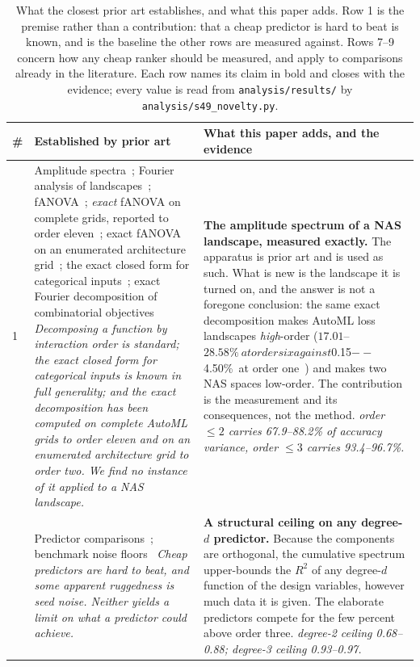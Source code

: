 \begin{table}[!t]
\centering
\caption{What the closest prior art establishes, and what this paper adds. Row 1 is the premise rather than a contribution: that a cheap predictor is hard to beat is known, and is the baseline the other rows are measured against. Rows 7--9 concern how any cheap ranker should be measured, and apply to comparisons already in the literature. Each row names its claim in bold and closes with the evidence; every value is read from \texttt{analysis/results/} by \texttt{analysis/s49\_novelty.py}.}
\label{tab:novelty}
\scriptsize
\setlength{\tabcolsep}{3pt}
\begin{tabular}{@{}p{}p{}p{}@{}}
\toprule
\# & Established by prior art & What this paper adds, and the evidence \\
\midrule
1 & Amplitude spectra~\cite{hordijk1998amplitude}; Fourier analysis of landscapes~\cite{weinberger1991fourier}; fANOVA~\cite{hutter2014fanova}; \emph{exact} fANOVA on complete grids, reported to order eleven~\cite{pushak2022automl}; exact fANOVA on an enumerated architecture grid~\cite{klein2019tabular}; the exact closed form for categorical inputs~\cite{ferrere2026exact}; exact Fourier decomposition of combinatorial objectives~\cite{elorza2025fourier} \emph{Decomposing a function by interaction order is standard; the exact closed form for categorical inputs is known in full generality; and the exact decomposition has been computed on complete AutoML grids to order eleven and on an enumerated architecture grid to order two. We find no instance of it applied to a NAS landscape.} & \textbf{The amplitude spectrum of a NAS landscape, measured exactly.} The apparatus is prior art and is used as such. What is new is the landscape it is turned on, and the answer is not a foregone conclusion: the same exact decomposition makes AutoML loss landscapes \emph{high}-order ($17.01$--$28.58\%\ at order six against $0.15$--$4.50\%\ at order one~\cite{pushak2022automl}) and makes two NAS spaces low-order. The contribution is the measurement and its consequences, not the method. \emph{order $\le 2$ carries 67.9--88.2\% of accuracy variance, order $\le 3$ carries 93.4--96.7\%.} \\
\addlinespace[2pt]
2 & Predictor comparisons~\cite{white2021powerful,ning2021evaluating}; benchmark noise floors~\cite{white2021exploring} \emph{Cheap predictors are hard to beat, and some apparent ruggedness is seed noise. Neither yields a limit on what a predictor could achieve.} & \textbf{A structural ceiling on any degree-$d$ predictor.} Because the components are orthogonal, the cumulative spectrum upper-bounds the $R^{2}$ of any degree-$d$ function of the design variables, however much data it is given. The elaborate predictors compete for the few percent above order three. \emph{degree-2 ceiling 0.68--0.88; degree-3 ceiling 0.93--0.97.} \\

\end{tabular}
\end{table}
